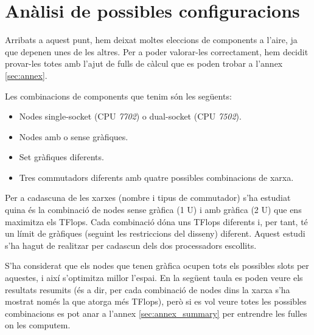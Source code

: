 \section{Anàlisi de possibles configuracions}\label{sec:analisi}

Arribats a aquest punt, hem deixat moltes eleccions de components a l'aire, ja que depenen unes de les altres. Per a poder valorar-les correctament, hem decidit provar-les totes amb l'ajut de fulls de càlcul que es poden trobar a l'annex \ref{sec:annex}.

Les combinacions de components que tenim són les següents:
\begin{itemize}
    \item {Nodes single-socket (CPU \textit{7702}) o dual-socket (CPU \textit{7502})}.
    \item {Nodes amb o sense gràfiques}.
    \item {Set gràfiques diferents}.
    \item {Tres commutadors diferents amb quatre possibles combinacions de xarxa}.
\end{itemize}



Per a cadascuna de les xarxes (nombre i tipus de commutador) s'ha estudiat quina és la combinació de nodes sense gràfica (1 U) i amb gràfica (2 U) que ens maximitza els TFlops. Cada combinació dóna uns TFlops diferents i, per tant, té un límit de gràfiques (seguint les restriccions del disseny) diferent. Aquest estudi s'ha hagut de realitzar per cadascun dels dos processadors escollits.

S'ha considerat que els nodes que tenen gràfica ocupen tots els possibles slots per aquestes, i així s'optimitza millor l'espai. En la següent taula es poden veure els resultats resumits (és a dir, per cada combinació de nodes dins la xarxa s'ha mostrat només la que atorga més TFlops), però si es vol veure totes les possibles combinacions es pot anar a l'annex \ref{sec:annex_summary} per entrendre les fulles on les computem.


